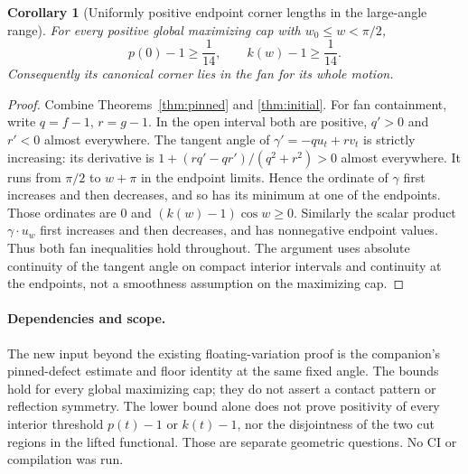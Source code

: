 \documentclass[11pt]{article}
\newtheorem{corollary}[theorem]{Corollary}
\begin{document}
\begin{corollary}[Uniformly positive endpoint corner lengths in the large-angle range]
For every positive global maximizing cap with $w_0\le w<\pi/2$,
\[
 p(0)-1\ge\frac1{14},\qquad k(w)-1\ge\frac1{14}.
\]
Consequently its canonical corner lies in the fan for its whole motion.
\end{corollary}
\begin{proof}
Combine Theorems~\ref{thm:pinned} and \ref{thm:initial}. For fan containment, write $q=f-1$, $r=g-1$. In the open interval both are positive, $q'>0$ and $r'<0$ almost everywhere. The tangent angle of $\gamma'=-q u_t+r v_t$ is strictly increasing: its derivative is $1+(rq'-qr')/(q^2+r^2)>0$ almost everywhere. It runs from $\pi/2$ to $w+\pi$ in the endpoint limits. Hence the ordinate of $\gamma$ first increases and then decreases, and so has its minimum at one of the endpoints. Those ordinates are $0$ and $(k(w)-1)\cos w\ge0$. Similarly the scalar product $\gamma\cdot u_w$ first increases and then decreases, and has nonnegative endpoint values. Thus both fan inequalities hold throughout. The argument uses absolute continuity of the tangent angle on compact interior intervals and continuity at the endpoints, not a smoothness assumption on the maximizing cap.
\end{proof}

\paragraph{Dependencies and scope.}
The new input beyond the existing floating-variation proof is the companion's pinned-defect estimate and floor identity at the same fixed angle. The bounds hold for every global maximizing cap; they do not assert a contact pattern or reflection symmetry. The lower bound alone does not prove positivity of every interior threshold $p(t)-1$ or $k(t)-1$, nor the disjointness of the two cut regions in the lifted functional. Those are separate geometric questions. No CI or compilation was run.
\end{document}
